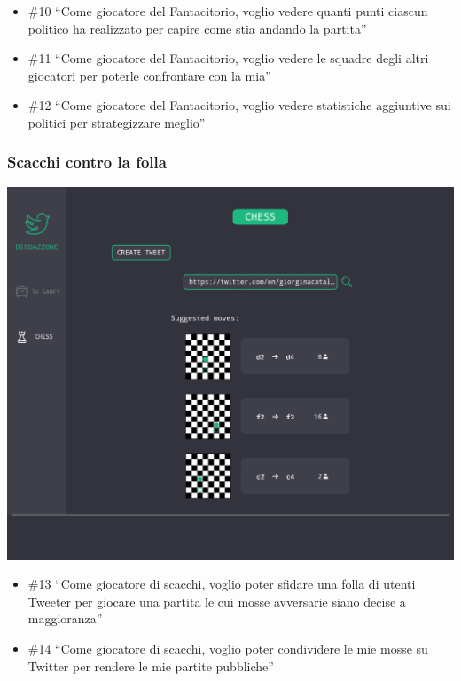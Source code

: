 \documentclass{article}
\begin{document}
\begin{itemize}
	\item \#10 ``Come giocatore del Fantacitorio, voglio vedere quanti punti ciascun
	      politico ha realizzato per capire come stia andando la partita''
	\item \#11 ``Come giocatore del Fantacitorio, voglio vedere le squadre degli altri
	      giocatori per poterle confrontare con la mia''
	\item \#12 ``Come giocatore del Fantacitorio, voglio vedere statistiche aggiuntive
	      sui politici per strategizzare meglio''
\end{itemize}

\subsubsection{Scacchi contro la folla}

\includegraphics[width=\textwidth]{mock-chess-moves.jpeg}

\begin{itemize}
	\item \#13 ``Come giocatore di scacchi, voglio poter sfidare una folla di
	      utenti Tweeter per giocare una partita le cui mosse avversarie siano
	      decise a maggioranza''
	\item \#14 ``Come giocatore di scacchi, voglio poter condividere le mie mosse
	      su Twitter per rendere le mie partite pubbliche''
\end{itemize}
\end{document}
